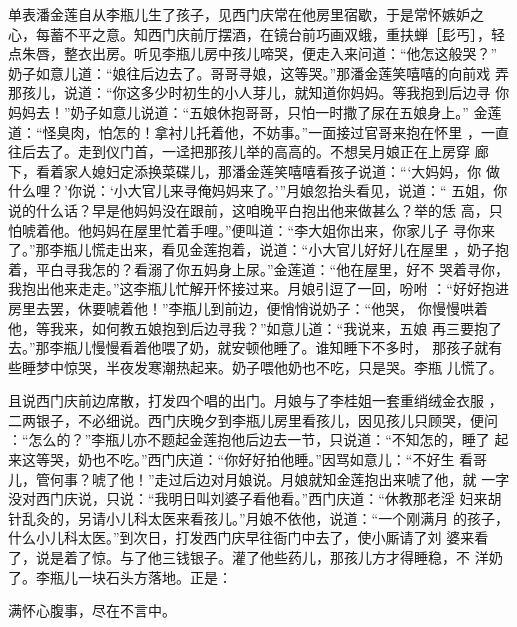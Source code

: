 单表潘金莲自从李瓶儿生了孩子，见西门庆常在他房里宿歇，于是常怀嫉妒之
心，每蓄不平之意。知西门庆前厅摆酒，在镜台前巧画双蛾，重扶蝉［髟丐］，轻
点朱唇，整衣出房。听见李瓶儿房中孩儿啼哭，便走入来问道：“他怎这般哭？”
奶子如意儿道：“娘往后边去了。哥哥寻娘，这等哭。”那潘金莲笑嘻嘻的向前戏
弄那孩儿，说道：“你这多少时初生的小人芽儿，就知道你妈妈。等我抱到后边寻
你妈妈去！”奶子如意儿说道：“五娘休抱哥哥，只怕一时撒了尿在五娘身上。”
金莲道：“怪臭肉，怕怎的！拿衬儿托着他，不妨事。”一面接过官哥来抱在怀里
，一直往后去了。走到仪门首，一迳把那孩儿举的高高的。不想吴月娘正在上房穿
廊下，看着家人媳妇定添换菜碟儿，那潘金莲笑嘻嘻看孩子说道：“‘大妈妈，你
做什么哩？’你说：‘小大官儿来寻俺妈妈来了。’”月娘忽抬头看见，说道：“
五姐，你说的什么话？早是他妈妈没在跟前，这咱晚平白抱出他来做甚么？举的恁
高，只怕唬着他。他妈妈在屋里忙着手哩。”便叫道：“李大姐你出来，你家儿子
寻你来了。”那李瓶儿慌走出来，看见金莲抱着，说道：“小大官儿好好儿在屋里
，奶子抱着，平白寻我怎的？看溺了你五妈身上尿。”金莲道：“他在屋里，好不
哭着寻你，我抱出他来走走。”这李瓶儿忙解开怀接过来。月娘引逗了一回，吩咐
：“好好抱进房里去罢，休要唬着他！”李瓶儿到前边，便悄悄说奶子：“他哭，
你慢慢哄着他，等我来，如何教五娘抱到后边寻我？”如意儿道：“我说来，五娘
再三要抱了去。”那李瓶儿慢慢看着他喂了奶，就安顿他睡了。谁知睡下不多时，
那孩子就有些睡梦中惊哭，半夜发寒潮热起来。奶子喂他奶也不吃，只是哭。李瓶
儿慌了。

且说西门庆前边席散，打发四个唱的出门。月娘与了李桂姐一套重绡绒金衣服
，二两银子，不必细说。西门庆晚夕到李瓶儿房里看孩儿，因见孩儿只顾哭，便问
：“怎么的？”李瓶儿亦不题起金莲抱他后边去一节，只说道：“不知怎的，睡了
起来这等哭，奶也不吃。”西门庆道：“你好好拍他睡。”因骂如意儿：“不好生
看哥儿，管何事？唬了他！”走过后边对月娘说。月娘就知金莲抱出来唬了他，就
一字没对西门庆说，只说：“我明日叫刘婆子看他看。”西门庆道：“休教那老淫
妇来胡针乱灸的，另请小儿科太医来看孩儿。”月娘不依他，说道：“一个刚满月
的孩子，什么小儿科太医。”到次日，打发西门庆早往衙门中去了，使小厮请了刘
婆来看了，说是着了惊。与了他三钱银子。灌了他些药儿，那孩儿方才得睡稳，不
洋奶了。李瓶儿一块石头方落地。正是：

满怀心腹事，尽在不言中。